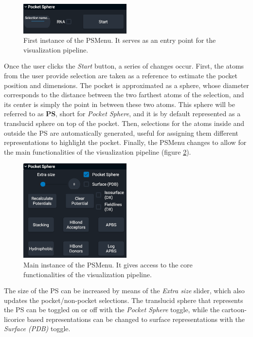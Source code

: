     \begin{figure}[H]
      \centering
      \includegraphics[width=0.5\textwidth]{figures/methods/umol_ps-start.png}
      \caption{\label{fig:methods/umol_ps-start} First instance of the PSMenu. It serves as an entry point for the visualization pipeline.}
    \end{figure}

    Once the user clicks the \textit{Start} button, a series of changes occur. First, the atoms from the user provide selection are taken as a reference to estimate the pocket position and dimensions. The pocket is approximated as a sphere, whose diameter corresponds to the distance between the two farthest atoms of the selection, and its center is simply the point in between these two atoms. This sphere will be referred to as \textbf{PS}, short for \textit{Pocket Sphere}, and it is by default represented as a translucid sphere on top of the pocket. Then, selections for the atoms inside and outside the PS are automatically generated, useful for assigning them different representations to highlight the pocket. Finally, the PSMenu changes to allow for the main functionalities of the visualization pipeline (figure \ref{fig:methods/umol_ps-main}).

    \begin{figure}[H]
      \centering
      \includegraphics[width=0.5\textwidth]{figures/methods/umol_ps-main.png}
      \caption{\label{fig:methods/umol_ps-main} Main instance of the PSMenu. It gives access to the core functionalities of the visualization pipeline.}
    \end{figure}

    The size of the PS can be increased by means of the \textit{Extra size} slider, which also updates the pocket/non-pocket selections. The translucid sphere that represents the PS can be toggled on or off with the \textit{Pocket Sphere} toggle, while the cartoon-licorice based representations can be changed to surface representations with the \textit{Surface (PDB)} toggle.

